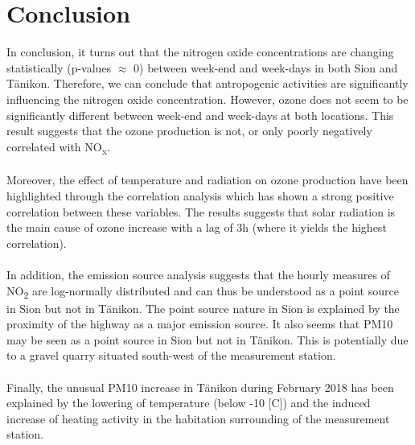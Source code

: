 \documentclass[a4paper, 12pt]{article}
\begin{document}
\section{Conclusion}
    In conclusion, it turns out that the nitrogen oxide concentrations are changing statistically (p-values $\approx$ 0) between week-end and week-days in both Sion and Tänikon. Therefore, we can conclude that antropogenic activities are significantly influencing the nitrogen oxide concentration. However, ozone does not seem to be significantly different between week-end and week-days at both locations. This result suggests that the ozone production is not, or only poorly negatively correlated with NO\textsubscript{x}. 
    \\
    \\
    Moreover, the effect of temperature and radiation on ozone production have been highlighted through the correlation analysis which has shown a strong positive correlation between these variables. The results suggests that solar radiation is the main cause of ozone increase with a lag of 3h (where it yields the highest correlation). 
    \\
    \\
    In addition, the emission source analysis suggests that the hourly measures of NO\textsubscript{2} are log-normally distributed and can thus be understood as a point source in Sion but not in Tänikon. The point source nature in Sion is explained by the proximity of the highway as a major emission source. It also seems that PM10 may be seen as a point source in Sion but not in Tänikon. This is potentially due to a gravel quarry situated south-west of the measurement station. 
    \\
    \\
    Finally, the unusual PM10 increase in Tänikon during February 2018 has been explained by the lowering of temperature (below -10 [\degree C]) and the induced increase of heating activity in the habitation surrounding of the measurement station. 

\newpage


\end{document}
